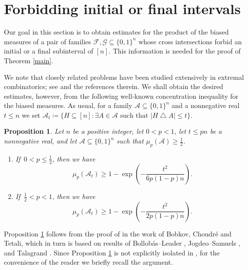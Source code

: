 \documentclass[10pt]{amsart}
\newtheorem{prop}[thm]{Proposition}
\theoremstyle{remark}
\newcommand{\meg}{\geqslant}
\newcommand{\mik}{\leqslant}
\newcommand{\Fcal}{\mathcal{F}}
\newcommand{\Gcal}{\mathcal{G}}
\newcommand{\Acal}{\mathcal{A}}
\newcommand{\pmeasure}[1]{\ensuremath{\mu_{p}\left(#1\right)}}
\begin{document}

\section{Forbidding initial or final intervals} \label{sec?}


Our goal in this section is to obtain estimates for the product of the biased measures of a pair of
families $\Fcal, \Gcal\subseteq \{0,1\}^n$ whose cross intersections forbid an initial or a final subinterval of $[n]$.
This information is needed for the proof of Theorem \ref{main}.

We note that closely related problems have been studied extensively in extremal combinatorics; see
\cite{El22,FT18} and the references therein.  We shall obtain the desired estimates, however,
from the following well-known concentration inequality for the biased measures.
As usual, for a family $\Acal\subseteq \{0,1\}^n$ and a nonnegative real $t\mik n$ we set
$\Acal_t\coloneqq \{H\subseteq [n]: \exists A\in\Acal \text{ such that } |H\bigtriangleup A|\mik t\}$.
\begin{prop} \label{p3.1}
Let $n$ be a positive integer, let $0<p<1$, let $t\mik pn$ be a nonnegative real, and let
$\Acal\subseteq \{0,1\}^n$ such that $\pmeasure{\Acal}\meg \frac12$.
\begin{enumerate}
\item[(i)] If\, $0<p\mik \frac12$, then we have
\begin{equation} \label{e3.1}
\pmeasure{\Acal_t}\meg 1-\exp\left(-\frac{t^2}{6p(1-p)n}\right).
\end{equation}
\item[(ii)] If\, $\frac12<p<1$, then we have
\begin{equation} \label{e3.2}
\pmeasure{\Acal_t}\meg 1-\exp\left(-\frac{t^2}{2p(1-p)n}\right).
\end{equation}
\end{enumerate}
\end{prop}
Proposition \ref{p3.1} follows from the proof of \cite[Proposition 2.4]{BHT06}
in the work of Bobkov, Choudr\'{e} and Tetali, which in turn is based on results
of Bollob\'{a}s--Leader \cite{BL91}, Jogdeo--Samuels \cite{JS68}, and Talagrand \cite{Ta89}.
Since Proposition \ref{p3.1} is not explicitly isolated in \cite{BHT06}, for the
convenience of the reader we briefly recall the argument.
\end{document}
